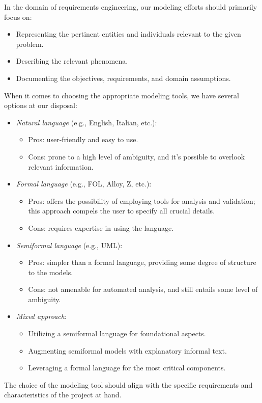 In the domain of requirements engineering, our modeling efforts should primarily focus on:
\begin{itemize}
    \item Representing the pertinent entities and individuals relevant to the given problem.
    \item Describing the relevant phenomena.
    \item Documenting the objectives, requirements, and domain assumptions.
\end{itemize}
When it comes to choosing the appropriate modeling tools, we have several options at our disposal:
\begin{itemize}
    \item \textit{Natural language} (e.g., English, Italian, etc.):
        \begin{itemize}
            \item Pros: user-friendly and easy to use.
            \item Cons: prone to a high level of ambiguity, and it's possible to overlook relevant information.
        \end{itemize}
    \item \textit{Formal language} (e.g., FOL, Alloy, Z, etc.):
        \begin{itemize}
            \item Pros: offers the possibility of employing tools for analysis and validation; this approach compels the user to specify all crucial details.
            \item Cons: requires expertise in using the language.
        \end{itemize}
    \item \textit{Semiformal language} (e.g., UML):
        \begin{itemize}
            \item Pros: simpler than a formal language, providing some degree of structure to the models.
            \item Cons: not amenable for automated analysis, and still entails some level of ambiguity.
        \end{itemize}
    \item \textit{Mixed approach}:             
        \begin{itemize}
            \item Utilizing a semiformal language for foundational aspects.
            \item Augmenting semiformal models with explanatory informal text.
            \item Leveraging a formal language for the most critical components.
        \end{itemize}
\end{itemize}
The choice of the modeling tool should align with the specific requirements and characteristics of the project at hand.